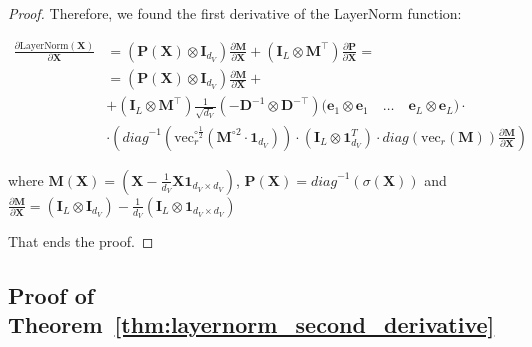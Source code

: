 \documentclass{article}
\begin{document}
\begin{proof}
Therefore, we found the first derivative of the LayerNorm function:

\begin{align*}
    \frac{\partial\text{LayerNorm}(\mathbf{X})}{\partial \mathbf{X}} &= ( \mathbf{P}(\mathbf{X}) \otimes \mathbf{I}_{d_V}) \frac{\partial \mathbf{M}}{\partial \mathbf{X}} + (\mathbf{I}_L\otimes \mathbf{M}^\top)\frac{\partial \mathbf{P}}{\partial \mathbf{X}} = \\
    & = ( \mathbf{P}(\mathbf{X}) \otimes \mathbf{I}_{d_V}) \frac{\partial \mathbf{M}}{\partial \mathbf{X}} +\\
    &+ (\mathbf{I}_L\otimes \mathbf{M}^\top)\frac{1}{\sqrt{d_V}}\left(-\mathbf{D}^{-1} \otimes \mathbf{D}^{-\top} \right) \Big(\mathbf{e}_1 \otimes \mathbf{e}_1 \quad \dots  \quad \mathbf{e}_L \otimes \mathbf{e}_L\Big) \cdot \\
    &\cdot \left(\textit{diag}^{-1}(\mathrm{vec}_r^{\circ \frac{1}{2}}(\mathbf{M}^{\circ{2}}\cdot\mathbf{1}_{d_V}))\cdot (\mathbf{I}_L \otimes \mathbf{1}^T_{d_V})\cdot \textit{diag}(\mathrm{vec}_r (\mathbf{M}))\frac{\partial \mathbf{M}}{\partial \mathbf{X}}\right)
\end{align*}

where $\mathbf{M}(\mathbf{X}) = (\mathbf{X} - \frac{1}{d_V}\mathbf{X} \mathbf{1}_{d_V \times d_V})$, $\mathbf{P}(\mathbf{X}) = \textit{diag}^{-1}(\sigma(\mathbf{X}))$ and $\frac{\partial \mathbf{M}}{\partial \mathbf{X}} = (\mathbf{I}_L \otimes \mathbf{I}_{d_V}) - \frac{1}{d_V}(\mathbf{I}_L \otimes \mathbf{1}_{d_V \times d_V})$

That ends the proof.

\end{proof}

\subsection{Proof of Theorem~\ref{thm:layernorm_second_derivative}}\label{app:proof_layernorm_second_derivative}
\end{document}
